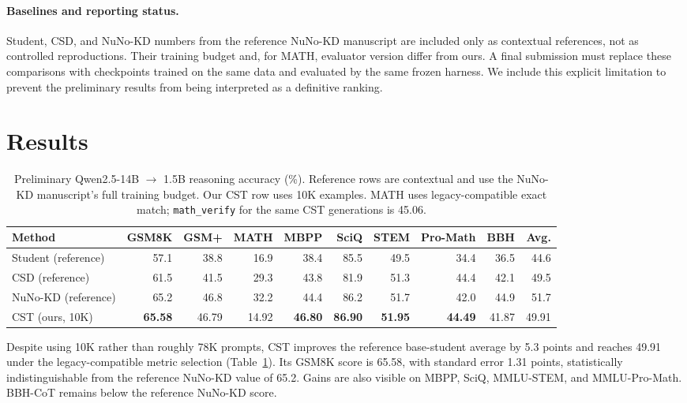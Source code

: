 \documentclass{article}
\newcommand{\cst}{\textsc{CST}}
\begin{document}
\paragraph{Baselines and reporting status.}
Student, CSD, and NuNo-KD numbers from the reference NuNo-KD manuscript
\citep{anonymous2026nuno} are included only as contextual
references, not as controlled reproductions.  Their training budget and, for
MATH, evaluator version differ from ours.  A final submission must replace
these comparisons with checkpoints trained on the same data and evaluated by
the same frozen harness.  We include this explicit limitation to prevent the
preliminary results from being interpreted as a definitive ranking.

\section{Results}

\begin{table}[t]
\caption{Preliminary Qwen2.5-14B $\rightarrow$ 1.5B reasoning accuracy (\%).
Reference rows are contextual and use the NuNo-KD manuscript's full training
budget.  Our \cst{} row uses 10K examples.  MATH uses legacy-compatible exact
match; \texttt{math\_verify} for the same \cst{} generations is 45.06.}
\label{tab:main-results}
\centering
\small
\setlength{\tabcolsep}{3.0pt}
\begin{tabular}{lrrrrrrrrr}
\toprule
Method & GSM8K & GSM+ & MATH & MBPP & SciQ & STEM & Pro-Math & BBH & Avg.\\
\midrule
Student (reference) & 57.1 & 38.8 & 16.9 & 38.4 & 85.5 & 49.5 & 34.4 & 36.5 & 44.6\\
CSD (reference) & 61.5 & 41.5 & 29.3 & 43.8 & 81.9 & 51.3 & 44.4 & 42.1 & 49.5\\
NuNo-KD (reference) & 65.2 & 46.8 & 32.2 & 44.4 & 86.2 & 51.7 & 42.0 & 44.9 & 51.7\\
\midrule
\cst{} (ours, 10K) & \textbf{65.58} & 46.79 & 14.92 & \textbf{46.80} & \textbf{86.90} &
\textbf{51.95} & \textbf{44.49} & 41.87 & 49.91\\
\bottomrule
\end{tabular}
\end{table}

Despite using 10K rather than roughly 78K prompts, \cst{} improves the
reference base-student average by 5.3 points and reaches 49.91 under the
legacy-compatible metric selection (Table~\ref{tab:main-results}).  Its
GSM8K score is 65.58, with standard error 1.31 points, statistically
indistinguishable from the reference NuNo-KD value of 65.2.  Gains are also
visible on MBPP, SciQ, MMLU-STEM, and MMLU-Pro-Math.  BBH-CoT remains below the
reference NuNo-KD score.
\end{document}

